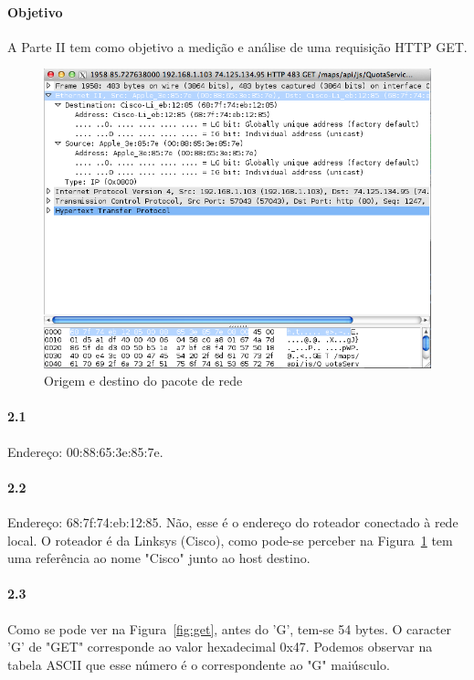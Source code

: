 \documentclass[12pt,a4paper]{report}
\begin{document}
\paragraph{Objetivo} A Parte II tem como objetivo a medição e análise de uma requisição HTTP GET.

\begin{figure}[h]
\centering
\includegraphics[width=\textwidth]{Ethernet-source-destination.png}
\caption{Origem e destino do pacote de rede}
\label{fig:ethernetsd}
\end{figure}

\paragraph{2.1} Endereço: 00:88:65:3e:85:7e.

\paragraph{2.2} Endereço: 68:7f:74:eb:12:85. Não, esse é o endereço do roteador conectado à rede local. O roteador é da Linksys (Cisco), como pode-se perceber na Figura~\ref{fig:ethernetsd} tem uma referência ao nome "Cisco" junto ao host destino.

\paragraph{2.3} Como se pode ver na Figura~\ref{fig:get}, antes do 'G', tem-se 54 bytes. O caracter 'G' de "GET" corresponde ao valor hexadecimal 0x47. Podemos observar na tabela ASCII que esse número é o correspondente ao "G" maiúsculo.
\end{document}
